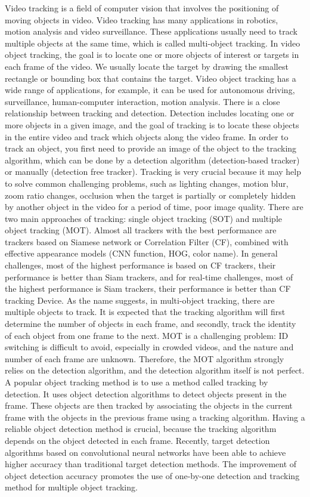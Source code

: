 Video tracking is a field of computer vision that involves the positioning of moving objects in video. Video tracking has many applications in robotics, motion analysis and video surveillance. These applications usually need to track multiple objects at the same time, which is called multi-object tracking. In video object tracking, the goal is to locate one or more objects of interest or targets in each frame of the video. We usually locate the target by drawing the smallest rectangle or bounding box that contains the target. Video object tracking has a wide range of applications, for example, it can be used for autonomous driving, surveillance, human-computer interaction, motion analysis. There is a close relationship between tracking and detection. Detection includes locating one or more objects in a given image, and the goal of tracking is to locate these objects in the entire video and track which objects along the video frame. In order to track an object, you first need to provide an image of the object to the tracking algorithm, which can be done by a detection algorithm (detection-based tracker) or manually (detection free tracker). Tracking is very crucial because it may help to solve common challenging problems, such as lighting changes, motion blur, zoom ratio changes, occlusion when the target is partially or completely hidden by another object in the video for a period of time, poor image quality. There are two main approaches of tracking: single object tracking (SOT) and multiple object tracking (MOT). Almost all trackers with the best performance are trackers based on Siamese network or Correlation Filter (CF), combined with effective appearance models (CNN function, HOG, color name). In general challenges, most of the highest performance is based on CF trackers, their performance is better than Siam trackers, and for real-time challenges, most of the highest performance is Siam trackers, their performance is better than CF tracking Device. As the name suggests, in multi-object tracking, there are multiple objects to track. It is expected that the tracking algorithm will first determine the number of objects in each frame, and secondly, track the identity of each object from one frame to the next.
MOT is a challenging problem: ID switching is difficult to avoid, especially in crowded videos, and the nature and number of each frame are unknown. Therefore, the MOT algorithm strongly relies on the detection algorithm, and the detection algorithm itself is not perfect. A popular object tracking method is to use a method called tracking by detection. It uses object detection algorithms to detect objects present in the frame. These objects are then tracked by associating the objects in the current frame with the objects in the previous frame using a tracking algorithm. Having a reliable object detection method is crucial, because the tracking algorithm depends on the object detected in each frame. Recently, target detection algorithms based on convolutional neural networks have been able to achieve higher accuracy than traditional target detection methods. The improvement of object detection accuracy promotes the use of one-by-one detection and tracking method for multiple object tracking.
